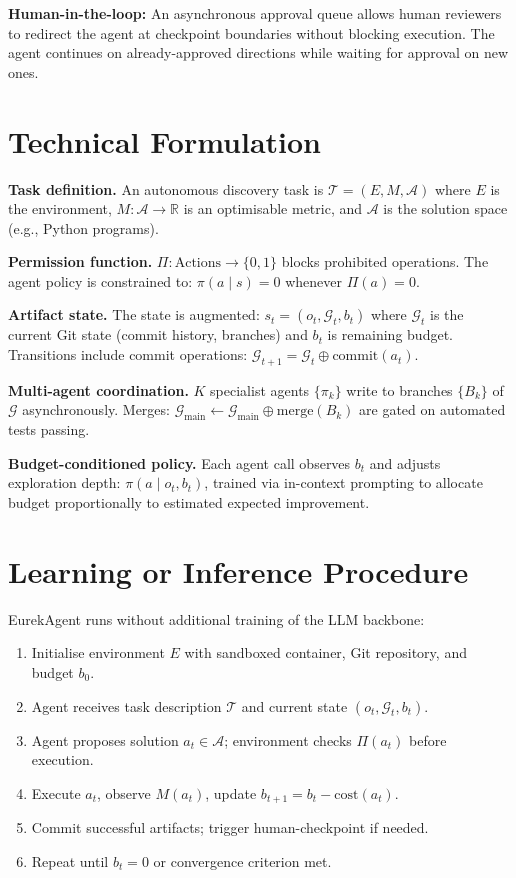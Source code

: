 \documentclass[10pt,twocolumn]{article}
\begin{document}
\textbf{Human-in-the-loop:} An asynchronous approval queue allows
human reviewers to redirect the agent at checkpoint boundaries without
blocking execution. The agent continues on already-approved directions
while waiting for approval on new ones.

\section{Technical Formulation}

\textbf{Task definition.}
An autonomous discovery task is $\mathcal{T}=(E, M, \mathcal{A})$ where
$E$ is the environment, $M:\mathcal{A}\to\mathbb{R}$ is an optimisable
metric, and $\mathcal{A}$ is the solution space (e.g., Python programs).

\textbf{Permission function.}
$\Pi: \mathrm{Actions} \to \{0,1\}$ blocks prohibited operations.
The agent policy is constrained to:
$\pi(a\mid s) = 0$ whenever $\Pi(a) = 0$.

\textbf{Artifact state.}
The state is augmented: $s_t = (o_t, \mathcal{G}_t, b_t)$ where
$\mathcal{G}_t$ is the current Git state (commit history, branches)
and $b_t$ is remaining budget. Transitions include commit operations:
$\mathcal{G}_{t+1} = \mathcal{G}_t \oplus \mathrm{commit}(a_t)$.

\textbf{Multi-agent coordination.}
$K$ specialist agents $\{\pi_k\}$ write to branches
$\{B_k\}$ of $\mathcal{G}$ asynchronously. Merges:
$\mathcal{G}_\mathrm{main} \leftarrow \mathcal{G}_\mathrm{main}
\oplus \mathrm{merge}(B_k)$ are gated on automated tests passing.

\textbf{Budget-conditioned policy.}
Each agent call observes $b_t$ and adjusts exploration depth:
$\pi(a\mid o_t, b_t)$, trained via in-context prompting to allocate
budget proportionally to estimated expected improvement.

\section{Learning or Inference Procedure}

EurekAgent runs without additional training of the LLM backbone:
\begin{enumerate}[itemsep=2pt,parsep=0pt]
  \item Initialise environment $E$ with sandboxed container,
    Git repository, and budget $b_0$.
  \item Agent receives task description $\mathcal{T}$ and current state
    $(o_t, \mathcal{G}_t, b_t)$.
  \item Agent proposes solution $a_t \in \mathcal{A}$; environment
    checks $\Pi(a_t)$ before execution.
  \item Execute $a_t$, observe $M(a_t)$, update $b_{t+1}=b_t-\mathrm{cost}(a_t)$.
  \item Commit successful artifacts; trigger human-checkpoint if needed.
  \item Repeat until $b_t = 0$ or convergence criterion met.
\end{enumerate}
\end{document}
